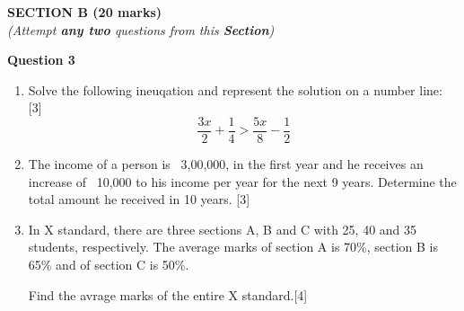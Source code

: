 \newpage
\begin{center}
   \large
   \textbf{SECTION B (20 marks)}\\
   \vspace{5mm}
   \normalsize
   \textit{(Attempt \textbf{any two} questions from this \textbf{Section})}
\end{center}
\par

\noindent
\textbf{Question 3}
\begin{enumerate}[label=(\roman*)]

    \item Solve the following ineuqation and represent the solution on 
        a number line: \hfill [3]
        \[
            \frac{3x}{2} + \frac{1}{4} > \frac{5x}{8} - \frac12
        \]

    \item The income of a person is \rupee~3,00,000, in the first year 
        and he receives an increase of \rupee~10,000 to his income per year
        for the next 9 years. Determine the total amount he received in 
        10 years. \hfill [3]

    \item In X standard, there are three sections A, B and C with 25, 40 
        and 35 students, respectively. The average marks of section A is 
        70\%, section B is 65\% and of section C is 50\%. 

        Find the avrage marks of the entire X standard.\hfill [4]

\end{enumerate}

